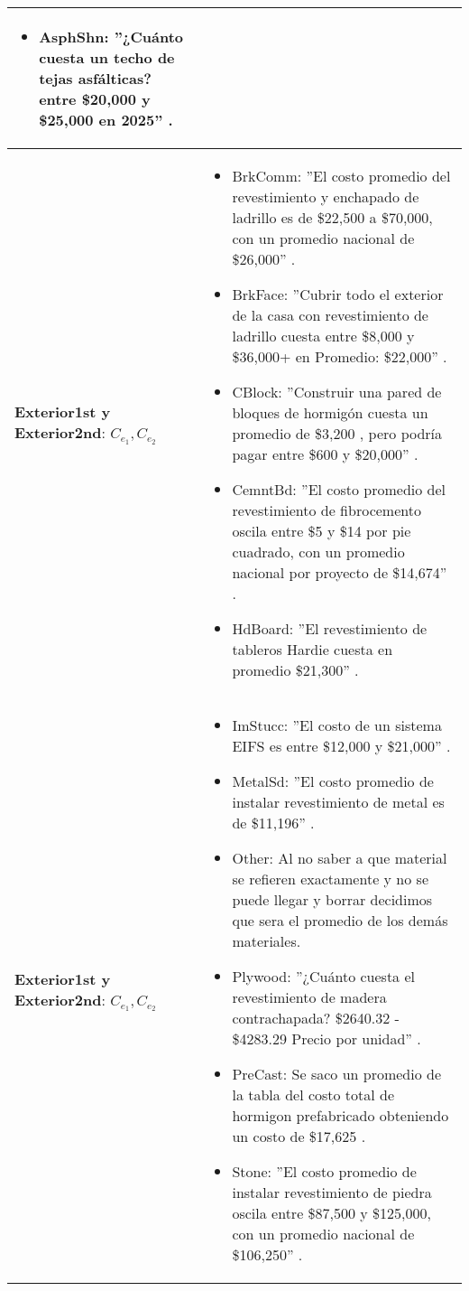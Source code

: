 \begin{longtable}{ | p{6cm} | p{6cm} | }
\begin{itemize}
        \item AsphShn: ''¿Cuánto cuesta un techo de tejas asfálticas? entre \$20,000 y \$25,000 en 2025'' \cite{Ragan2025}.
    \end{itemize}\\
    \hline
    \textbf{Exterior1st y Exterior2nd}: $C_{e_1}, C_{e_2}$ &
    \begin{itemize}
        \item BrkComm: ''El costo promedio del revestimiento y enchapado de ladrillo es de \$22,500 a \$70,000, con un promedio nacional de \$26,000'' \cite{Lacoma2025}.
        \item BrkFace: ''Cubrir todo el exterior de la casa con revestimiento de ladrillo cuesta entre \$8,000 y \$36,000+ en Promedio: \$22,000'' \cite{Carlson2025}.
        \item CBlock: ''Construir una pared de bloques de hormigón cuesta un promedio de \$3,200 , pero podría pagar entre \$600 y \$20,000'' \cite{Bennett2025}.
        \item CemntBd: ''El costo promedio del revestimiento de fibrocemento oscila entre \$5 y \$14 por pie cuadrado, con un promedio nacional por proyecto de \$14,674'' 
        \cite{Minasian-Koncewicz2025}.
        \item HdBoard: ''El revestimiento de tableros Hardie cuesta en promedio \$21,300'' \cite{Simms2025}.
    \end{itemize}\\
    \hline
    \textbf{Exterior1st y Exterior2nd}: $C_{e_1}, C_{e_2}$ & \begin{itemize}
        \item ImStucc: ''El costo de un sistema EIFS es entre \$12,000 y \$21,000'' \cite{HomeaAvisor2022}.
        \item MetalSd: ''El costo promedio de instalar revestimiento de metal es de \$11,196'' \cite{HomeAdvisor2025h}.
        \item Other: Al no saber a que material se refieren exactamente y no se puede llegar y borrar decidimos que sera el promedio de los demás materiales.
        \item Plywood: ''¿Cuánto cuesta el revestimiento de madera contrachapada? \$2640.32 - \$4283.29 Precio por unidad'' \cite{Planner5Ds.f.b}.
        \item PreCast: Se saco un promedio de la tabla del costo total de hormigon prefabricado obteniendo un costo de \$17,625 \cite{Noel2025}.
        \item Stone: ''El costo promedio de instalar revestimiento de piedra oscila entre \$87,500 y \$125,000, con un promedio nacional de \$106,250'' \cite{Nati2024}.

\end{itemize}
\end{longtable}
